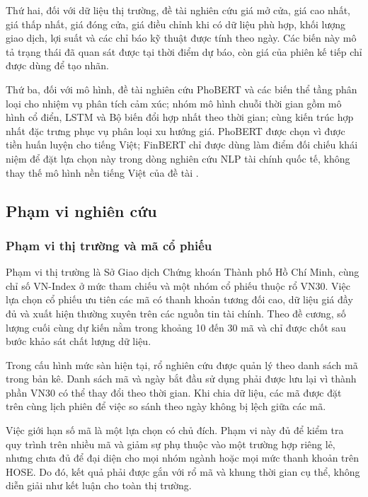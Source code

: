 Thứ hai, đối với dữ liệu thị trường, đề tài nghiên cứu giá mở cửa, giá cao nhất, giá
thấp nhất, giá đóng cửa, giá điều chỉnh khi có dữ liệu phù hợp, khối lượng giao dịch,
lợi suất và các chỉ báo kỹ thuật được tính theo ngày. Các biến này mô tả trạng thái đã
quan sát được tại thời điểm dự báo, còn giá của phiên kế tiếp chỉ được dùng để tạo nhãn.

Thứ ba, đối với mô hình, đề tài nghiên cứu PhoBERT và các biến thể tầng phân loại cho
nhiệm vụ phân tích cảm xúc; nhóm mô hình chuỗi thời gian gồm mô hình cổ điển, LSTM và
Bộ biến đổi hợp nhất theo thời gian; cùng kiến trúc hợp nhất đặc trưng phục vụ phân loại
xu hướng giá. PhoBERT được chọn vì được tiền huấn luyện cho tiếng Việt; FinBERT chỉ
được dùng làm điểm đối chiếu khái niệm để đặt lựa chọn này trong dòng nghiên cứu NLP
tài chính quốc tế, không thay thế mô hình nền tiếng Việt của đề tài
\cite{Nguyen2020_200300744v3,Yang2020_200608097v2}.

\subsection{Phạm vi nghiên cứu}

\subsubsection{Phạm vi thị trường và mã cổ phiếu}

Phạm vi thị trường là Sở Giao dịch Chứng khoán Thành phố Hồ Chí Minh, cùng chỉ số
VN-Index ở mức tham chiếu và một nhóm cổ phiếu thuộc rổ VN30. Việc lựa chọn cổ phiếu
ưu tiên các mã có thanh khoản tương đối cao, dữ liệu giá đầy đủ và xuất hiện thường
xuyên trên các nguồn tin tài chính. Theo đề cương, số lượng cuối cùng dự kiến nằm trong
khoảng 10 đến 30 mã và chỉ được chốt sau bước khảo sát chất lượng dữ liệu.

Trong cấu hình mức sàn hiện tại, rổ nghiên cứu được quản lý theo danh sách mã trong
bản kê. Danh sách mã và ngày bắt đầu sử dụng phải được lưu lại vì thành phần VN30 có
thể thay đổi theo thời gian. Khi chia dữ liệu, các mã được đặt trên cùng lịch phiên để
việc so sánh theo ngày không bị lệch giữa các mã.

Việc giới hạn số mã là một lựa chọn có chủ đích. Phạm vi này đủ để kiểm tra quy trình
trên nhiều mã và giảm sự phụ thuộc vào một trường hợp riêng lẻ, nhưng chưa đủ để đại
diện cho mọi nhóm ngành hoặc mọi mức thanh khoản trên HOSE. Do đó, kết quả phải được
gắn với rổ mã và khung thời gian cụ thể, không diễn giải như kết luận cho toàn thị
trường.

